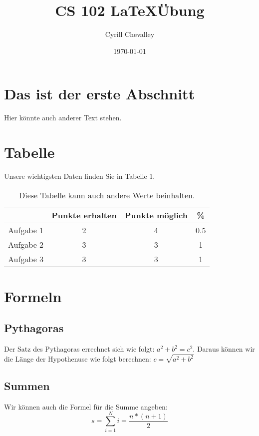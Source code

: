 \documentclass[11pt,a4paper]{article}
\title{CS 102 \LaTeX Übung}
\author{Cyrill Chevalley}
\date{\today}
\begin{document}
\maketitle

\section{Das ist der erste Abschnitt}
Hier könnte auch anderer Text stehen.

\section{Tabelle}
Unsere wichtigsten Daten finden Sie in Tabelle 1.
	\begin{table}[h]
	\begin{centering}
	\begin{tabular}{c|c|c|c}
	&Punkte erhalten&Punkte möglich& \% \\
	\hline
	Aufgabe 1&2&4&0.5 \\
	Aufgabe 2&3&3&1 \\
	Aufgabe 3&3&3&1 \\
	\end{tabular}
	\caption{Diese Tabelle kann auch andere Werte beinhalten.}
	\end{centering}
	\end{table}
	
\section{Formeln}
\subsection{Pythagoras}
Der Satz des Pythagoras errechnet sich wie folgt: $a^{2} + b^2 = c^2$.
Daraus können wir die Länge der Hypothenuse wie folgt berechnen: 
$c = \sqrt{a^2 + b^2} $

\subsection{Summen}	
Wir können auch die Formel für die Summe angeben:
\begin{equation}
s=\sum \limits_{i=1}^{N} i = \frac{n \ast (n+1)}{2}
\end{equation}
\end{document}
